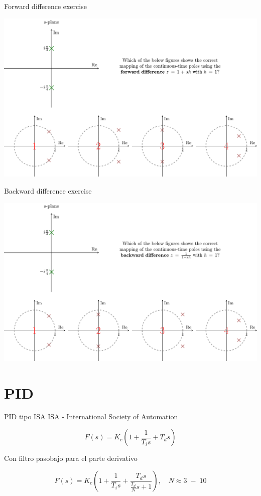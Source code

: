 \documentclass[presentation,aspectratio=1610]{beamer}
\begin{document}
\begin{frame}[label={sec:org9bb57fa}]{Forward difference exercise}
\begin{center}
\includegraphics[width=\linewidth]{../../figures/forward-diff-exercise}
\end{center}
\end{frame}
\begin{frame}[label={sec:orgaf8c1b0}]{Backward difference exercise}
\begin{center}
\includegraphics[width=\linewidth]{../../figures/backward-diff-exercise}
\end{center}
\end{frame}


\section{PID}
\label{sec:org5a7a827}
\begin{frame}[label={sec:orgb2215e6}]{PID tipo ISA}
ISA - International Society of Automation

\[ F(s) = K_c\left( 1 + \frac{1}{T_i s} + T_d s\right) \]

Con filtro pasobajo para el parte derivativo

\[ F(s) = K_c\left( 1 + \frac{1}{T_i s} + \frac{T_d s}{\frac{T_d}{N} s + 1}\right), \quad N \approx 3\; - \; 10 \]
\end{frame}
\end{document}
